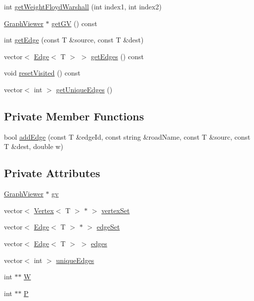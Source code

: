 \begin{DoxyCompactItemize}
\item 
int \hyperlink{classGraph_ab314d60da32e5e0080e51c9c17f06f85}{get\+Weight\+Floyd\+Warshall} (int index1, int index2)
\item 
\hyperlink{classGraphViewer}{Graph\+Viewer} $\ast$ \hyperlink{classGraph_a8cfc98c097359592094c27f2118dc6a7}{get\+GV} () const 
\item 
int \hyperlink{classGraph_ac9ce9fbd0d125874296f2df5731e1a72}{get\+Edge} (const T \&source, const T \&dest)
\item 
vector$<$ \hyperlink{classEdge}{Edge}$<$ T $>$ $>$ \hyperlink{classGraph_aa46616d7684e3f3e69cb0d5497a8b45e}{get\+Edges} () const 
\item 
void \hyperlink{classGraph_a3c32b686c689011a360e7e25a76ee511}{reset\+Visited} () const 
\item 
vector$<$ int $>$ \hyperlink{classGraph_a6d54a3a7d9c687fa4d81af01c5ef5b75}{get\+Unique\+Edges} ()
\end{DoxyCompactItemize}
\subsection*{Private Member Functions}
\begin{DoxyCompactItemize}
\item 
bool \hyperlink{classGraph_afced43fb6c491d1294b00798dd9644ad}{add\+Edge} (const T \&edge\+Id, const string \&road\+Name, const T \&sourc, const T \&dest, double w)
\end{DoxyCompactItemize}
\subsection*{Private Attributes}
\begin{DoxyCompactItemize}
\item 
\hyperlink{classGraphViewer}{Graph\+Viewer} $\ast$ \hyperlink{classGraph_afbbcf226b738a3dd936173881991b31e}{gv}
\item 
vector$<$ \hyperlink{classVertex}{Vertex}$<$ T $>$ $\ast$ $>$ \hyperlink{classGraph_a73d4e735fc0a7c83c9c689a2b53fa623}{vertex\+Set}
\item 
vector$<$ \hyperlink{classEdge}{Edge}$<$ T $>$ $\ast$ $>$ \hyperlink{classGraph_a83ebb4fdb2b6a21d4112d4d179230e95}{edge\+Set}
\item 
vector$<$ \hyperlink{classEdge}{Edge}$<$ T $>$ $>$ \hyperlink{classGraph_afbdd278e1f3cb43805ef769404a3afd1}{edges}
\item 
vector$<$ int $>$ \hyperlink{classGraph_a6f829bb651ea6c0b2aa45564dd4eda25}{unique\+Edges}
\item 
int $\ast$$\ast$ \hyperlink{classGraph_a20edce9af2c8ea8725ccbb5201eace38}{W}
\item 
int $\ast$$\ast$ \hyperlink{classGraph_a8198bca6e66c0c95e24062e40813ebba}{P}
\end{DoxyCompactItemize}


